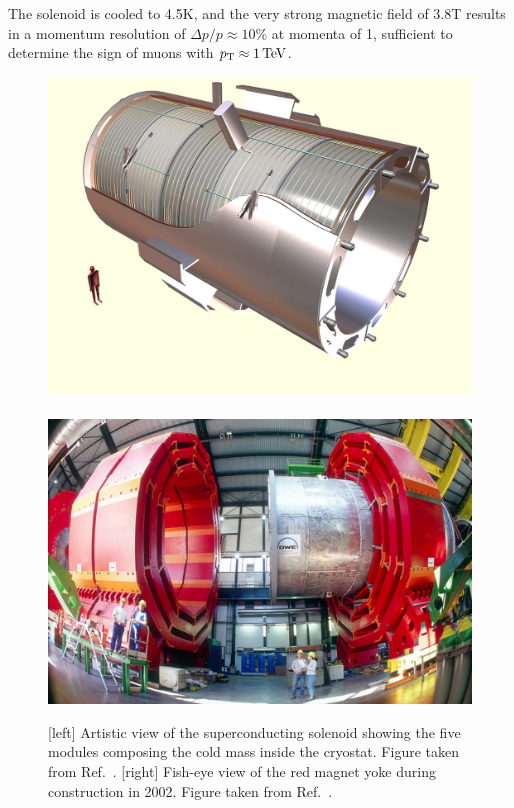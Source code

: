 The solenoid is cooled to 4.5\unit{K}, and the
very strong magnetic field of 3.8\unit{T} results in a momentum resolution of $\Delta p / p \approx
10\%$ at momenta of 1\TeV, sufficient to determine the sign of muons with $p_{\mathrm{T}} \approx 1 \,\text{Te\hspace{-.08em}V}$. 


\begin{figure}[htpb]
  \centering
  \includegraphics[height=0.2\textheight,clip=true,trim=0 2cm 0 0]{figures/cms/CMS_solenoid}
  ~
  \includegraphics[height=0.2\textheight]{figures/cms/cms_magnet}
  \caption{[left] Artistic view of the superconducting solenoid showing the five modules composing
the cold mass inside the cryostat. Figure taken from Ref.~\cite{Chatrchyan:2008aa}.
  [right] Fish-eye view of the red magnet yoke during construction in
2002. Figure taken from Ref.~\cite{CMS_magnet}.
  \label{fig:cms_magnet}}
\end{figure}

